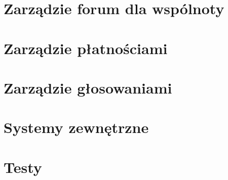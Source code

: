 \section{Zarządzie forum dla wspólnoty}

\section{Zarządzie płatnościami}

\section{Zarządzie głosowaniami}

\section{Systemy zewnętrzne}

\section{Testy}



